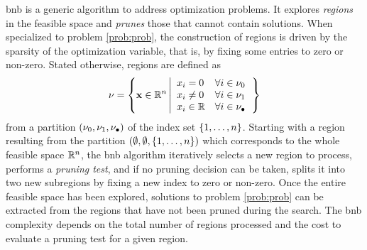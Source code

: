 \documentclass[11pt]{article}
\begin{document}
\gls{bnb} is a generic algorithm to address optimization problems.
It explores \emph{regions} in the feasible space and \emph{prunes} those that cannot contain solutions.
When specialized to problem \eqref{prob:prob}, the construction of regions is driven by the sparsity of the optimization variable, that is, by fixing some entries to zero or non-zero.
Stated otherwise, regions are defined as
\begin{equation}
    \label{eq:region}
    \nodesymbol = \left\{
        \pv \in \kR^{\pdim}
        \left|
        \begin{array}{ll}
            \pvi{\idxentry} = 0 &\forall \idxentry \in \setzero \\
            \pvi{\idxentry} \neq 0 &\forall \idxentry \in \setone \\
            \pvi{\idxentry} \in \kR &\forall \idxentry \in \setnone
        \end{array}
        \right.
    \right\}
\end{equation}
from a partition $(\nu_0,\nu_1,\nu_\bullet)$ of the index set $\{1,\dots,n\}$.
Starting with a region resulting from the partition $(\emptyset,\emptyset,\{1,\dots,n\})$ which corresponds to the whole feasible space $\kR^{\pdim}$, the \gls{bnb} algorithm iteratively selects a new region to process, performs a \emph{pruning test}, and if no pruning decision can be taken, splits it into two new subregions by fixing a new index to zero or non-zero.
Once the entire feasible space has been explored, solutions to problem \eqref{prob:prob} can be extracted from the regions that have not been pruned during the search.
The \gls{bnb} complexity depends on the total number of regions processed and the cost to evaluate a pruning test for a given region.
\end{document}
